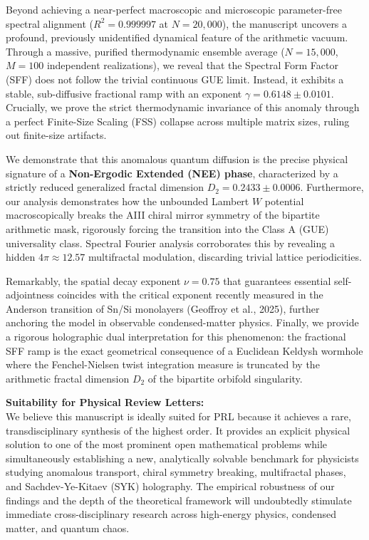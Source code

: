\documentclass[11pt,a4paper]{article}
\begin{document}
Beyond achieving a near-perfect macroscopic and microscopic parameter-free spectral alignment ($R^2 = 0.999997$ at $N = 20,000$), the manuscript uncovers a profound, previously unidentified dynamical feature of the arithmetic vacuum. Through a massive, purified thermodynamic ensemble average ($N = 15,000$, $M = 100$ independent realizations), we reveal that the Spectral Form Factor (SFF) does not follow the trivial continuous GUE limit. Instead, it exhibits a stable, sub-diffusive fractional ramp with an exponent $\gamma = 0.6148 \pm 0.0101$. Crucially, we prove the strict thermodynamic invariance of this anomaly through a perfect Finite-Size Scaling (FSS) collapse across multiple matrix sizes, ruling out finite-size artifacts.

We demonstrate that this anomalous quantum diffusion is the precise physical signature of a \textbf{Non-Ergodic Extended (NEE) phase}, characterized by a strictly reduced generalized fractal dimension $D_2 = 0.2433 \pm 0.0006$. Furthermore, our analysis demonstrates how the unbounded Lambert $W$ potential macroscopically breaks the AIII chiral mirror symmetry of the bipartite arithmetic mask, rigorously forcing the transition into the Class A (GUE) universality class. Spectral Fourier analysis corroborates this by revealing a hidden $4\pi \approx 12.57$ multifractal modulation, discarding trivial lattice periodicities.

Remarkably, the spatial decay exponent $\nu = 0.75$ that guarantees essential self-adjointness coincides with the critical exponent recently measured in the Anderson transition of Sn/Si monolayers (Geoffroy et al., 2025), further anchoring the model in observable condensed-matter physics. Finally, we provide a rigorous holographic dual interpretation for this phenomenon: the fractional SFF ramp is the exact geometrical consequence of a Euclidean Keldysh wormhole where the Fenchel-Nielsen twist integration measure is truncated by the arithmetic fractal dimension $D_2$ of the bipartite orbifold singularity.

\textbf{Suitability for Physical Review Letters:}\\
We believe this manuscript is ideally suited for PRL because it achieves a rare, transdisciplinary synthesis of the highest order. It provides an explicit physical solution to one of the most prominent open mathematical problems while simultaneously establishing a new, analytically solvable benchmark for physicists studying anomalous transport, chiral symmetry breaking, multifractal phases, and Sachdev-Ye-Kitaev (SYK) holography. The empirical robustness of our findings and the depth of the theoretical framework will undoubtedly stimulate immediate cross-disciplinary research across high-energy physics, condensed matter, and quantum chaos.
\end{document}
